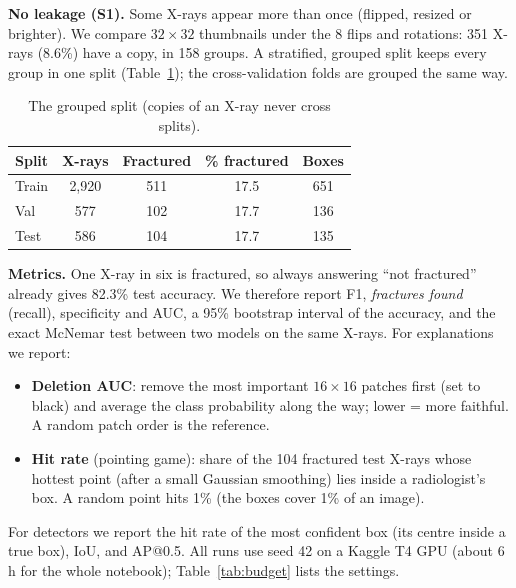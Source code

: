 \documentclass[conference]{IEEEtran}
\begin{document}
\textbf{No leakage (S1).} Some X-rays appear more than once (flipped, resized or brighter). We compare $32\times32$
thumbnails under the 8 flips and rotations: 351 X-rays (8.6\%) have a copy, in 158 groups. A stratified, grouped split
keeps every group in one split (Table~\ref{tab:data}); the cross-validation folds are grouped the same way.

\begin{table}[t]
\centering
\caption{The grouped split (copies of an X-ray never cross splits).}
\label{tab:data}
\renewcommand{\arraystretch}{1.1}
\begin{tabular}{lcccc}
\toprule
Split & X-rays & Fractured & \% fractured & Boxes \\
\midrule
Train & 2,920 & 511 & 17.5 & 651 \\
Val   & 577   & 102 & 17.7 & 136 \\
Test  & 586   & 104 & 17.7 & 135 \\
\bottomrule
\end{tabular}
\end{table}

\textbf{Metrics.} One X-ray in six is fractured, so always answering ``not fractured'' already gives 82.3\% test
accuracy. We therefore report F1, \emph{fractures found} (recall), specificity and AUC, a 95\% bootstrap interval of
the accuracy, and the exact McNemar test between two models on the same X-rays. For explanations we report:
\begin{itemize}
\item \textbf{Deletion AUC}: remove the most important $16\times16$ patches first (set to black) and average the class
probability along the way; lower = more faithful. A random patch order is the reference.
\item \textbf{Hit rate} (pointing game): share of the 104 fractured test X-rays whose hottest point (after a small
Gaussian smoothing) lies inside a radiologist's box. A random point hits 1\% (the boxes cover 1\% of an image).
\end{itemize}
For detectors we report the hit rate of the most confident box (its centre inside a true box), IoU, and AP@0.5. All
runs use seed 42 on a Kaggle T4 GPU (about 6\,h for the whole notebook); Table~\ref{tab:budget} lists the settings.
\end{document}
